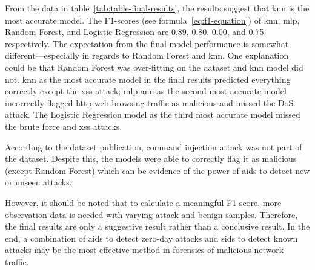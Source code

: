 From the data in table~\ref{tab:table-final-results}, the results suggest that \gls{knn} is the most accurate model.
The F1-scores (see formula~\ref{eq:f1-equation}) of \gls{knn}, \gls{mlp}, Random Forest, and Logistic Regression are 0.89, 0.80, 0.00, and 0.75 respectively.
The expectation from the final model performance is somewhat different---especially in regards to Random Forest and \gls{knn}.
One explanation could be that Random Forest was \gls{over-fitting} on the dataset and \gls{knn} model did not.
\gls{knn} as the most accurate model in the final results predicted everything correctly except the \gls{xss} attack;
\gls{mlp} \gls{ann} as the second most accurate model incorrectly flagged \gls{http} web browsing traffic as malicious and missed the \gls{DoS} attack.
The Logistic Regression model as the third most accurate model missed the brute force and \gls{xss} attacks.

\clearpage
According to the dataset publication, command injection attack was not part of the dataset.
Despite this, the models were able to correctly flag it as malicious (except Random Forest) which can be evidence of the power of \gls{aids} to detect new or unseen attacks.

However, it should be noted that to calculate a meaningful F1-score, more observation data is needed with varying attack and benign samples.
Therefore, the final results are only a suggestive result rather than a conclusive result.
In the end, a combination of \gls{aids} to detect \gls{zero-day} attacks and \gls{sids} to detect known attacks may be the most effective method in
forensics of malicious network traffic.
